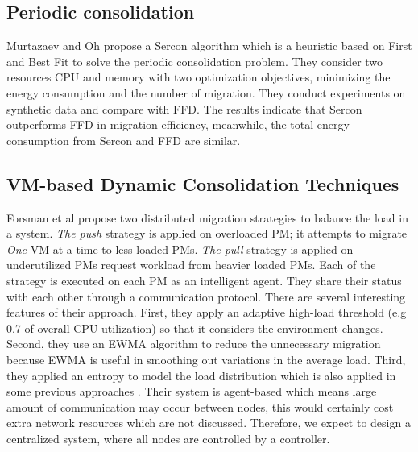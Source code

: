 
\subsection{Periodic consolidation}

Murtazaev and Oh \cite{Murtazaev:2011ue} propose a Sercon algorithm which is a heuristic based on First and Best Fit to solve the periodic consolidation problem. They consider two resources CPU and memory with two optimization objectives, minimizing the energy consumption and the number of migration. They conduct experiments on synthetic data and compare with FFD. The results indicate that Sercon outperforms FFD in migration efficiency, meanwhile, the total energy consumption from Sercon and FFD are similar. 

\subsection{VM-based Dynamic Consolidation Techniques}
\label{sec:dynamic}

Forsman et al \cite{Forsman:2015ca} propose two distributed migration strategies to balance the load in a system. \emph{The push} strategy is applied on overloaded PM; it attempts to migrate \emph{One} VM at a time to less loaded PMs. \emph{The pull} strategy is applied on underutilized PMs request workload from heavier loaded PMs. Each of the strategy is executed on each PM as an intelligent agent. They share their status with each other through a communication protocol. There are several interesting features of their approach. First, they apply an adaptive high-load threshold (e.g 0.7 of overall CPU utilization) so that it considers the environment changes. Second, they use an EWMA algorithm to reduce the unnecessary migration because EWMA \cite{Holt:2004fs} is useful in smoothing out variations in the average load. Third, they applied an entropy to model the load distribution which is also applied in some previous approaches \cite{Qin:2012wu,Kunkle:2008bz}. Their system is agent-based which means large amount of communication may occur between nodes, this would certainly cost extra network resources which are not discussed. Therefore, we expect to design a centralized system, where all nodes are controlled by a controller. 

